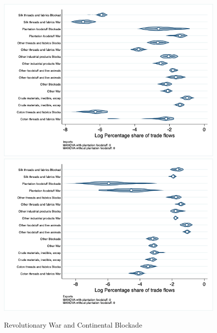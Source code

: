 \documentclass[12pt,a4paper,notitlepage,english]{article}
\begin{document}
\begin{appendix}
\begin{figure}[h!]
\centering
\caption{Revolutionary War and Continental Blockade}
\label{rev_block_nat_distr_aggr}
\includegraphics[scale=.4]{rev_block_nat_distr_Iaggr}
\includegraphics[scale=.4]{rev_block_nat_distr_Xaggr}
\end{figure}


\end{appendix}
\end{document}
